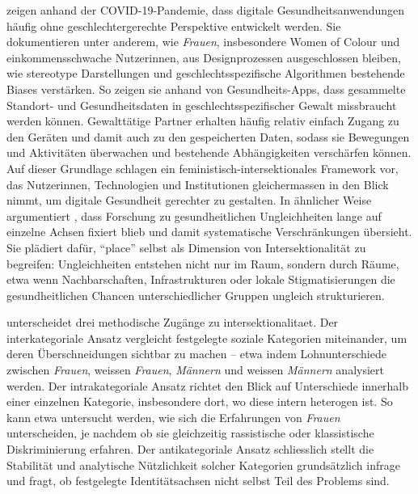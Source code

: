 \textcite{figueroaNeedFeministIntersectionality2021} zeigen anhand der COVID-19-Pandemie, dass digitale Gesundheitsanwendungen häufig ohne geschlechtergerechte Perspektive entwickelt werden. Sie dokumentieren unter anderem, wie \emph{Frauen}, insbesondere Women of Colour und einkommensschwache Nutzer\genderstern innen, aus Designprozessen ausgeschlossen bleiben, wie stereotype Darstellungen und geschlechtsspezifische Algorithmen bestehende Biases verstärken. So zeigen sie anhand von Gesundheits-Apps, dass gesammelte Standort- und Gesundheitsdaten in geschlechtsspezifischer Gewalt missbraucht werden können. Gewalttätige Partner erhalten häufig relativ einfach Zugang zu den Geräten und damit auch zu den gespeicherten Daten, sodass sie Bewegungen und Aktivitäten überwachen und bestehende Abhängigkeiten verschärfen können. Auf dieser Grundlage schlagen \citeauthor{figueroaNeedFeministIntersectionality2021} ein feministisch-intersektionales Framework vor, das Nutzer\genderstern innen, Technologien und Institutionen gleichermassen in den Blick nimmt, um digitale Gesundheit gerechter zu gestalten. In ähnlicher Weise argumentiert \textcite{bambraPlacingIntersectionalInequalities2022}, dass Forschung zu gesundheitlichen Ungleichheiten lange auf einzelne Achsen fixiert blieb und damit systematische Verschränkungen übersieht. Sie plädiert dafür, \enquote{place} selbst als Dimension von Intersektionalität zu begreifen: Ungleichheiten entstehen nicht nur im Raum, sondern durch Räume, etwa wenn Nachbarschaften, Infrastrukturen oder lokale Stigmatisierungen die gesundheitlichen Chancen unterschiedlicher Gruppen ungleich strukturieren.

\textcite{mccallComplexityIntersectionality2005} unterscheidet drei methodische Zugänge zu \gls{intersektionalitaet}. Der interkategoriale Ansatz vergleicht festgelegte soziale Kategorien miteinander, um deren Überschneidungen sichtbar zu machen -- etwa indem Lohnunterschiede zwischen \emph{} \emph{Frauen}, weissen \emph{Frauen}, \emph{} \emph{Männern} und weissen \emph{Männern} analysiert werden. Der intrakategoriale Ansatz richtet den Blick auf Unterschiede innerhalb einer einzelnen Kategorie, insbesondere dort, wo diese intern heterogen ist. So kann etwa untersucht werden, wie sich die Erfahrungen von \emph{Frauen} unterscheiden, je nachdem ob sie gleichzeitig rassistische oder klassistische Diskriminierung erfahren. Der antikategoriale Ansatz schliesslich stellt die Stabilität und analytische Nützlichkeit solcher Kategorien grundsätzlich infrage und fragt, ob festgelegte Identitätsachsen nicht selbst Teil des Problems sind.

